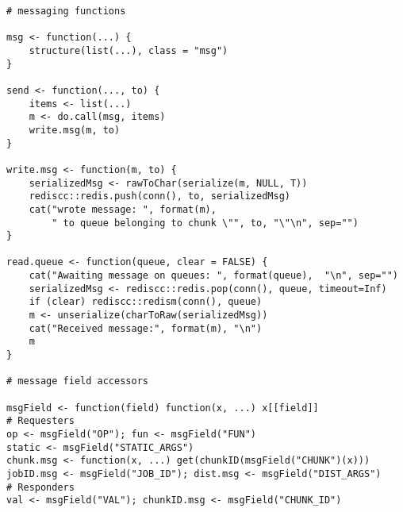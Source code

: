 \hypertarget{lst:wo-ass-messages}{%
\label{lst:wo-ass-messages}}%
\begin{verbatim}
# messaging functions

msg <- function(...) {
    structure(list(...), class = "msg")
}

send <- function(..., to) {
    items <- list(...)
    m <- do.call(msg, items)
    write.msg(m, to)
}

write.msg <- function(m, to) {
    serializedMsg <- rawToChar(serialize(m, NULL, T))
    rediscc::redis.push(conn(), to, serializedMsg)
    cat("wrote message: ", format(m),
        " to queue belonging to chunk \"", to, "\"\n", sep="")
}

read.queue <- function(queue, clear = FALSE) {
    cat("Awaiting message on queues: ", format(queue),  "\n", sep="")
    serializedMsg <- rediscc::redis.pop(conn(), queue, timeout=Inf)
    if (clear) rediscc::redism(conn(), queue)
    m <- unserialize(charToRaw(serializedMsg))
    cat("Received message:", format(m), "\n")
    m
}

# message field accessors

msgField <- function(field) function(x, ...) x[[field]]
# Requesters
op <- msgField("OP"); fun <- msgField("FUN")
static <- msgField("STATIC_ARGS")
chunk.msg <- function(x, ...) get(chunkID(msgField("CHUNK")(x)))
jobID.msg <- msgField("JOB_ID"); dist.msg <- msgField("DIST_ARGS")
# Responders
val <- msgField("VAL"); chunkID.msg <- msgField("CHUNK_ID")
\end{verbatim}
